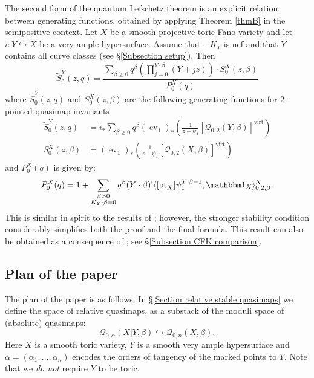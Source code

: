 \documentclass[10pt]{amsart}
\newcommand{\Q}[4]{\mathcal{Q}_{#1,#2}(#3,#4)}
\newcommand{\virt}[1]{[#1]^{\operatorname{virt}}}
\newcommand{\pt}{\operatorname{pt}}
\newcommand{\ev}{\operatorname{ev}}
\theoremstyle{definition}
\newenvironment{customthm}[1]
  {\renewcommand\theinnercustomthm{#1}\innercustomthm}
  {\endinnercustomthm}
\theoremstyle{definition}
\begin{document}
The second form of the quantum Lefschetz theorem is an explicit relation between generating functions, obtained by applying Theorem \ref{thmB} in the semipositive context.
\begin{customthm}{C}[\textbf{Theorem \ref{Theorem Quantum Lefschetz}}]\label{thmC}
Let $X$ be a smooth projective toric Fano variety and let $i\colon Y \hookrightarrow X$ be a very ample hypersurface. Assume that $-K_Y$ is nef and that $Y$ contains all curve classes (see \S \ref{Subsection setup}). Then
\begin{equation*}
\tilde{S}_0^Y(z,q) = \dfrac{\sum_{\beta\geq 0} q^\beta\left(\prod_{j=0}^{Y\cdot\beta}(Y+jz)\right)\cdot S_0^X(z,\beta)}{P_0^X(q)}
\end{equation*}
where $\tilde{S}_0^Y(z,q)$ and $S_0^X(z,\beta)$ are the following generating functions for $2$-pointed quasimap invariants
\begin{align*}
\tilde{S}_0^Y(z,q)&=i_* \sum_{\beta \geq 0} q^\beta (\ev_1)_*\left(\frac{1}{z-\psi_1} \virt{\Q{0}{2}{Y}{\beta}}\right)\\
S_0^X(z,\beta)&=(\ev_1)_*\left(\frac{1}{z-\psi_1} \virt{\Q{0}{2}{X}{\beta}}\right)
\end{align*}
and $P_0^X(q)$ is given by:
\begin{equation*}
P_0^X(q) = 1 + \sum_{\substack{\beta>0 \\ K_Y\cdot\beta=0}} q^\beta(Y\cdot\beta)!\langle [\pt_X] \psi_1^{Y\cdot\beta-1} ,\mathbbm 1_{X}\rangle_{0,2,\beta}^X.
\end{equation*}
\end{customthm}
\noindent This is similar in spirit to the results of \cite{Ga-MF}; however, the stronger stability condition considerably simplifies both the proof and the final formula. This result can also be obtained as a consequence of \cite[Corollary~5.5.1]{CF-K-wallcrossing}; see \S \ref{Subsection CFK comparison}. 



\subsection{Plan of the paper}
The plan of the paper is as follows. In \S \ref{Section relative stable quasimaps} we define the space of relative quasimaps, as a substack of the moduli space of (absolute) quasimaps:
\begin{equation*} \Q{0}{\alpha}{X|Y}{\beta} \hookrightarrow \Q{0}{n}{X}{\beta}. \end{equation*}
Here $X$ is a smooth toric variety, $Y$ is a smooth very ample hypersurface and $\alpha = (\alpha_1, \ldots, \alpha_n)$ encodes the orders of tangency of the marked points to $Y$. Note that we \emph{do not} require $Y$ to be toric.
\end{document}
